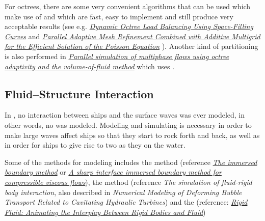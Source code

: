 For octrees, there are some very convenient algorithms that can be used which make use of  and which are fast, easy to implement and still produce very acceptable results (see e.g. \textit{\href{http://j.teresco.org/research/publications/octpart02/octpart02.pdf}{Dynamic Octree Load Balancing Using Space-Filling Curves}} \citep{temp} and \textit{\href{http://downloads.isrn.com/journals/appmath/2012/246491.pdf}{Parallel Adaptive Mesh Refinement Combined with Additive Multigrid for the Efficient Solution of the Poisson Equation}} \citep{temp}). Another kind of partitioning is also performed in \textit{\href{http://gfs.sourceforge.net/papers/agbaglah2011.pdf}{Parallel simulation of multiphase flows using octree adaptivity and the volume-of-fluid method}} \citep{temp} which uses .

\subsection{Fluid--Structure Interaction}

In \thisprojectwork, no interaction between ships and the surface waves was ever modeled, in other words, no \FSI was modeled. Modeling and simulating \FSI is necessary in order to make large waves affect ships so that they start to rock forth and back, as well as in order for ships to give rise to two  as they \sail on the water.
    
Some of the methods for modeling \FSI includes the \IB method (reference \textit{\href{http://www4.ncsu.edu/~zhilin/TEACHING/MA798Z/Peskin1.pdf}{The immersed boundary method}} or \textit{\href{http://www.cecs.wright.edu/~haibo.dong/wp-content/themes/publications/IBM_JCP_2007.pdf}{A sharp interface immersed boundary method for compressible viscous flows}}), the \VOS method (reference \textit{The simulation of fluid-rigid body interaction}, also described in \textit{Numerical Modeling of Deforming Bubble Transport Related to Cavitating Hydraulic Turbines}) and the  (reference: \textit{\href{http://www.amath.unc.edu/Faculty/mucha/Reprints/siggraph04.pdf}{Rigid Fluid: Animating the Interplay Between Rigid Bodies and Fluid}})

